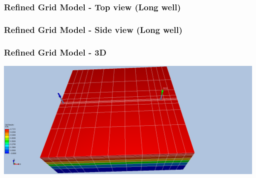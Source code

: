 \begin{frame}
    \frametitle{Refined Grid Model - Top view (Long well)}
    \begin{center}
        
    \end{center}
\end{frame}


\begin{frame}
    \frametitle{Refined Grid Model - Side view (Long well)}
    \begin{center}
        
    \end{center}
\end{frame}

\begin{frame}
    \frametitle{Refined Grid Model - 3D}
    \begin{center}
        \includegraphics[width=\textwidth]{figures/resinsight/1b-refined-end.png}
    \end{center}
\end{frame}


